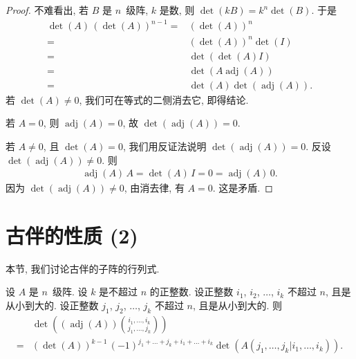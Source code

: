 \begin{proof}
    不难看出, 若 \(B\) 是 \(n\)~级阵, \(k\) 是数, 则
    \(\det {(kB)} = k^n \det {(B)}\).
    于是
    \begin{align*}
        \det {(A)}\, (\det {(A)})^{n-1}
        = {} &
        (\det {(A)})^n
        \\
        = {} &
        (\det {(A)})^n \det {(I)}
        \\
        = {} &
        \det {(\det {(A)} I)}
        \\
        = {} &
        \det {(A \operatorname{adj} {(A)})}
        \\
        = {} &
        \det {(A)} \det {(\operatorname{adj} {(A)})}.
    \end{align*}
    若 \(\det {(A)} \neq 0\),
    我们可在等式的二侧消去它,
    即得结论.


    若 \(A = 0\), 则 \(\operatorname{adj} {(A)} = 0\),
    故 \(\det {(\operatorname{adj} {(A)})} = 0\).

    若 \(A \neq 0\), 且 \(\det {(A)} = 0\),
    我们用反证法说明
    \(\det {(\operatorname{adj} {(A)})} = 0\).
    反设
    \(\det {(\operatorname{adj} {(A)})} \neq 0\).
    则
    \begin{align*}
        \operatorname{adj} {(A)}\, A
        = \det {(A)}\, I
        = 0
        = \operatorname{adj} {(A)}\, 0.
    \end{align*}
    因为
    \(\det {(\operatorname{adj} {(A)})} \neq 0\),
    由消去律, 有 \(A = 0\).
    这是矛盾.
\end{proof}

\section{古伴的性质 (2)}

本节, 我们讨论古伴的子阵的行列式.


\begin{theorem}
    设 \(A\) 是 \(n\)~级阵.
    设 \(k\) 是不超过 \(n\) 的正整数.
    设正整数 \(i_1\), \(i_2\), \(\dots\), \(i_k\)
    不超过 \(n\), 且是从小到大的.
    设正整数 \(j_1\), \(j_2\), \(\dots\), \(j_k\)
    不超过 \(n\), 且是从小到大的.
    则
    \begin{equation}
        \begin{aligned}
                 & \det {\left(
                (\operatorname{adj} {(A)})
                \binom{i_1,\dots,i_k}{j_1,\dots,j_k}
                \right)}
            \\
            = {} &
            (\det {(A)})^{k-1}\,
            (-1)^{j_1 + \dots + j_k + i_1 + \dots + i_k}
            \det {(A({j_1,\dots,j_k}|{i_1,\dots,i_k}))}.
        \end{aligned}
        \label{eq:C2401}
    \end{equation}
\end{theorem}

